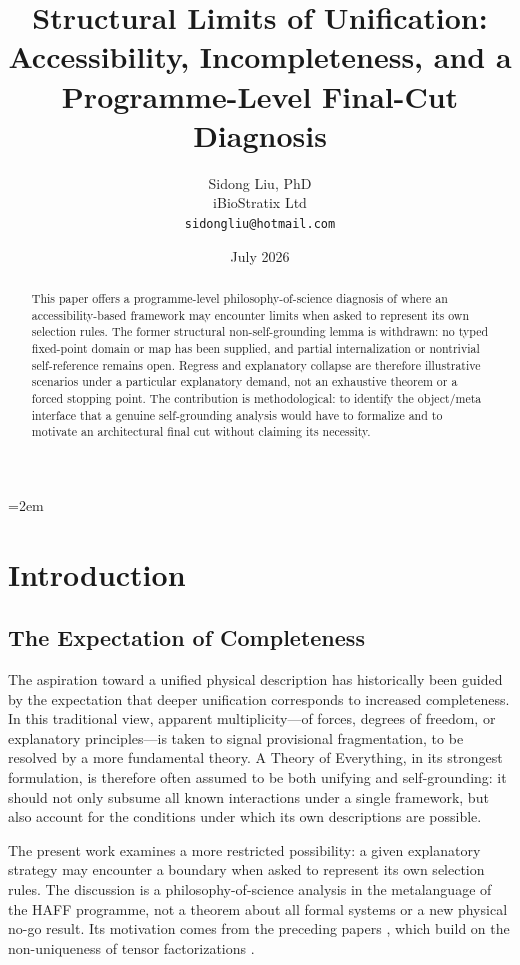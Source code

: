 \documentclass[12pt,a4paper]{article}
\title{Structural Limits of Unification:\\
Accessibility, Incompleteness, and a Programme-Level Final-Cut Diagnosis}
\author{
  Sidong Liu, PhD \\
  iBioStratix Ltd \\
  \texttt{sidongliu@hotmail.com}
}
\date{July 2026}
\begin{document}
\emergencystretch=2em
\raggedbottom
{}

\maketitle

\begin{abstract}
This paper offers a programme-level philosophy-of-science diagnosis of where an accessibility-based framework may encounter limits when asked to represent its own selection rules. The former structural non-self-grounding lemma is withdrawn: no typed fixed-point domain or map has been supplied, and partial internalization or nontrivial self-reference remains open. Regress and explanatory collapse are therefore illustrative scenarios under a particular explanatory demand, not an exhaustive theorem or a forced stopping point. The contribution is methodological: to identify the object/meta interface that a genuine self-grounding analysis would have to formalize and to motivate an architectural final cut without claiming its necessity.
\end{abstract}

\section{Introduction}
\label{sec:intro}

\subsection{The Expectation of Completeness}

The aspiration toward a unified physical description has historically been guided by the expectation that deeper unification corresponds to increased completeness. In this traditional view, apparent multiplicity---of forces, degrees of freedom, or explanatory principles---is taken to signal provisional fragmentation, to be resolved by a more fundamental theory. A Theory of Everything, in its strongest formulation, is therefore often assumed to be both unifying and self-grounding: it should not only subsume all known interactions under a single framework, but also account for the conditions under which its own descriptions are possible.

The present work examines a more restricted possibility: a given explanatory strategy may encounter a boundary when asked to represent its own selection rules.  The discussion is a philosophy-of-science analysis in the metalanguage of the HAFF programme, not a theorem about all formal systems or a new physical no-go result.  Its motivation comes from the preceding papers \cite{Liu2026PaperA,Liu2026PaperB,Liu2026PaperC,Liu2026PaperD,Liu2026PaperE,Liu2026PaperF}, which build on the non-uniqueness of tensor factorizations \cite{Zanardi2001,Zanardi2004}.
\end{document}
